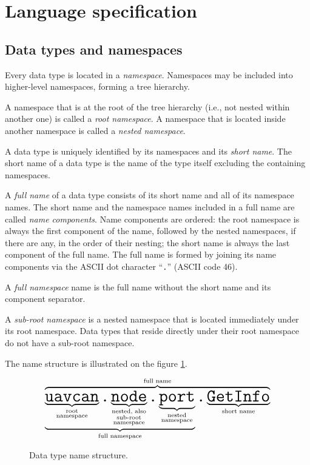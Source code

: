 \section{Language specification}

\subsection{Data types and namespaces}

Every data type is located in a \emph{namespace}.
Namespaces may be included into higher-level namespaces, forming a tree hierarchy.

A namespace that is at the root of the tree hierarchy (i.e., not nested within another one)
is called a \emph{root namespace}.
A namespace that is located inside another namespace is called a \emph{nested namespace}.

A data type is uniquely identified by its namespaces and its \emph{short name}.
The short name of a data type is the name of the type itself excluding the containing namespaces.

A \emph{full name} of a data type consists of its short name and all of its namespace names.
The short name and the namespace names included in a full name are called \emph{name components}.
Name components are ordered: the root namespace is always the first component of the name,
followed by the nested namespaces, if there are any, in the order of their nesting;
the short name is always the last component of the full name.
The full name is formed by joining its name components via the ASCII dot character ``\verb|.|'' (ASCII code 46).

A \emph{full namespace} name is the full name without the short name and its component separator.

A \emph{sub-root namespace} is a nested namespace that is located immediately under its root namespace.
Data types that reside directly under their root namespace do not have a sub-root namespace.

The name structure is illustrated on the figure \ref{fig:dsdl_data_type_name_structure}.

\begin{figure}[H]
    $$
    \overbrace{
        \underbrace{
            \underbrace{\texttt{\huge{uavcan}}}_{\substack{\text{root} \\ \text{namespace}}}%
            \texttt{\huge{.}}%
            \underbrace{\texttt{\huge{node}}}_{\substack{\text{nested, also} \\ \text{sub-root} \\ \text{namespace}}}%
            \texttt{\huge{.}}%
            \underbrace{\texttt{\huge{port}}}_{\substack{\text{nested} \\ \text{namespace}}}%
        }_{\text{full namespace}}%
        \texttt{\huge{.}}%
        \underbrace{\texttt{\huge{GetInfo}}}_{\text{short name}}
    }^{\text{full name}}
    $$
    \caption{Data type name structure.\label{fig:dsdl_data_type_name_structure}}
\end{figure}

